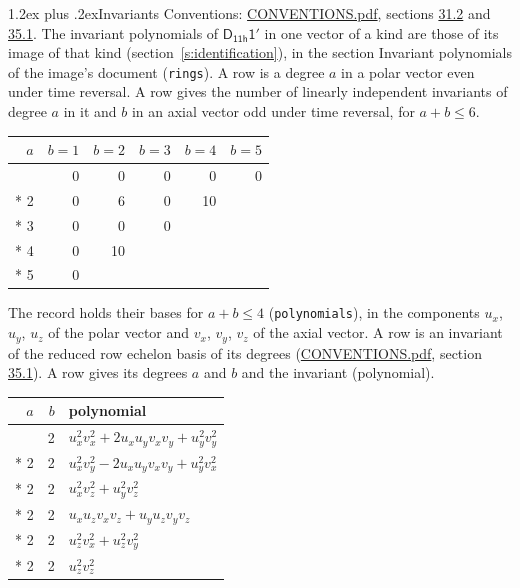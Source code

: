 \documentclass[10pt,a4paper]{article}
\makeatletter
\renewcommand\section{\@startsection{section}{1}{\z@}{-3ex plus -1ex minus -.2ex}%
  {1.2ex plus .2ex}{\normalfont\large\sffamily\bfseries\color{parttitle}}}
\numberwithin{equation}{section}
\newcommand{\grp}[1]{\mathsf{#1}}
\makeatother
\begin{document}
\section{Invariants}\label{s:invariants}
Conventions: \href{../../CONVENTIONS.pdf}{CONVENTIONS.pdf}, sections \href{../../CONVENTIONS.pdf\#conv.31.2}{31.2} and \href{../../CONVENTIONS.pdf\#conv.35.1}{35.1}.
The invariant polynomials of $\grp{D_{11h}1'}$ in one vector of a kind are those of its image of that kind (section~\ref{s:identification}), in the section Invariant polynomials of the image's document (\texttt{rings}).
\leavevmode\label{n:index.degree.polar}\label{n:index.degree.axial}A row is a degree $a$ in a polar vector even under time reversal. A row gives the number of linearly independent invariants of degree $a$ in it and $b$ in an axial vector odd under time reversal, for $a + b \le 6$.
{\small\begin{longtable}{@{}rrrrrr@{}}\toprule
$a$ & $b = 1$ & $b = 2$ & $b = 3$ & $b = 4$ & $b = 5$\\\midrule\endhead
\bottomrule\endfoot\endlastfoot
1 & 0 & 0 & 0 & 0 & 0\\*
2 & 0 & 6 & 0 & 10 & \\*
3 & 0 & 0 & 0 &  & \\*
4 & 0 & 10 &  &  & \\*
5 & 0 &  &  &  & \\
\bottomrule\end{longtable}}
\leavevmode\label{n:local.component.polar}\label{n:local.component.axial}The record holds their bases for $a + b \le 4$ (\texttt{polynomials}), in the components $u_{x}$, $u_{y}$, $u_{z}$ of the polar vector and $v_{x}$, $v_{y}$, $v_{z}$ of the axial vector. \label{n:head.polynomial}A row is an invariant of the reduced row echelon basis of its degrees (\href{../../CONVENTIONS.pdf}{CONVENTIONS.pdf}, section \href{../../CONVENTIONS.pdf\#conv.35.1}{35.1}). A row gives its degrees $a$ and $b$ and the invariant (polynomial).
{\small\renewcommand{\arraystretch}{1.2}\begin{longtable}{@{}rrl@{}}\toprule
$a$ & $b$ & polynomial\\\midrule\endhead
\bottomrule\endfoot\endlastfoot
2 & 2 & $u_{x}^{2}v_{x}^{2} + 2u_{x}u_{y}v_{x}v_{y} + u_{y}^{2}v_{y}^{2}$\\*
2 & 2 & $u_{x}^{2}v_{y}^{2} - 2u_{x}u_{y}v_{x}v_{y} + u_{y}^{2}v_{x}^{2}$\\*
2 & 2 & $u_{x}^{2}v_{z}^{2} + u_{y}^{2}v_{z}^{2}$\\*
2 & 2 & $u_{x}u_{z}v_{x}v_{z} + u_{y}u_{z}v_{y}v_{z}$\\*
2 & 2 & $u_{z}^{2}v_{x}^{2} + u_{z}^{2}v_{y}^{2}$\\*
2 & 2 & $u_{z}^{2}v_{z}^{2}$\\
\bottomrule\end{longtable}}
\end{document}
